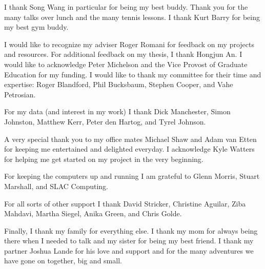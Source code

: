I thank Song Wang in particular for being my best buddy.  Thank you for the
many talks over lunch and the many tennis lessons. 
I thank Kurt Barry for being my best gym buddy.

I would like to recognize my adviser Roger Romani for 
feedback on my projects and resources.
For additional feedback on my thesis, I thank Hongjun An.
I would like to acknowledge Peter Michelson and 
the Vice Provost of Graduate Education for my funding.
I would like to thank my committee for their time and 
expertise:
Roger Blandford, Phil Bucksbaum, Stephen Cooper, and Vahe Petrosian.

For my data (and interest in my work) I thank
Dick Manchester, Simon Johnston, Matthew Kerr, Peter den Hartog, and Tyrel Johnson.

A very special thank you to my office mates
Michael Shaw and Adam van Etten for keeping me entertained and
delighted everyday.  I acknowledge Kyle Watters for helping
me get started on my project in the very beginning.

For keeping the computers up and running I am grateful to
Glenn Morris, 
Stuart Marshall, and
SLAC Computing.

For all sorts of other support I thank
David Stricker,
Christine Aguilar,
Ziba Mahdavi, Martha Siegel, Anika Green, and Chris Golde.


Finally, I thank my family for everything else.  I thank 
my mom for always being there when I needed to talk and my
sister for being my best friend.  
I thank my partner Joshua Lande for 
his love and support and for the many adventures we have gone on together, big and small.  
